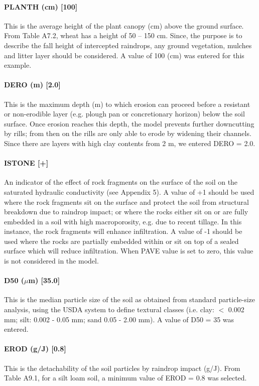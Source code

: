 \paragraph{PLANTH (cm) [100]}
This is the average height of the plant canopy (cm) above the ground surface.
From Table A7.2, wheat has a height of 50 -- 150 cm. Since, the purpose is to
describe the fall height of intercepted raindrops, any ground vegetation,
mulches and litter layer should be considered. A value of 100 (cm) was entered
for this example.
 
\paragraph{DERO (m) [2.0]}
This is the maximum depth (m) to which erosion can proceed before a resistant
or non-erodible layer (e.g. plough pan or concretionary horizon) below the soil
surface. Once erosion reaches this depth, the model prevents further downcutting
by rills; from then on the rills are only able to erode by widening their
channels. Since there are layers with high clay contents from 2 m, we entered
DERO = 2.0.
 
\paragraph{ISTONE [+]}
An indicator of the effect of rock fragments on the surface of the soil on the
saturated hydraulic conductivity (see Appendix 5).
A value of +1 should be used where the rock fragments sit on the surface and
protect the soil from structural breakdown due to raindrop impact; or where the
rocks either sit on or are fully embedded in a soil with high macroporosity,
e.g. due to recent tillage. In this instance, the rock fragments will enhance
infiltration.
A value of -1 should be used where the rocks are partially embedded within or
sit on top of a sealed surface which will reduce infiltration.
When PAVE value is set to zero, this value is not considered in the model.
 
\paragraph{D50 ($\mu$m) [35.0]}
This is the median particle size of the soil as obtained from standard
particle-size analysis, using the USDA system to define textural classes (i.e.
clay: $<$ 0.002 mm; silt: 0.002 - 0.05 mm; sand 0.05 - 2.00 mm).
A value of D50 = 35 was entered.
 
\paragraph{EROD (g/J) [0.8]}
This is the detachability of the soil particles by raindrop impact (g/J). From
Table A9.1, for a silt loam soil, a minimum value of EROD = 0.8 was selected.
 
